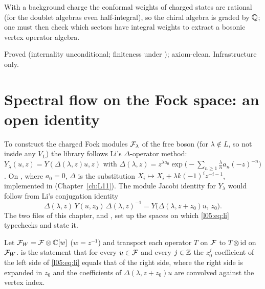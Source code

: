 \begin{physics}
With a background charge the conformal weights of charged states are rational (for the doublet algebras even
half-integral), so the chiral algebra is graded by ${\mathbb{Q}}$; one must then check which sectors have integral weights to
extract a bosonic vertex operator algebra.
\end{physics}

\begin{status}
Proved (internality unconditional; finiteness under ); axiom-clean. Infrastructure only.
\end{status}

\section{Spectral flow on the Fock space: an open identity}\label{l05:sec:li}

To construct the charged Fock modules $\mathcal{F}_\lambda$ of the free boson (for $\lambda\notin L$, so not inside any $V_L$) the
library follows Li's $\Delta$-operator method: $Y_\lambda(u,z)=Y(\Delta(\lambda,z)u,z)$ with
$\Delta(\lambda,z)=z^{\lambda a_0}\exp\big(-\sum_{n\ge1}\frac{\lambda}{n}a_n(-z)^{-n}\big)$. On , where $a_0=0$, $\Delta$ is the
substitution $X_i\mapsto X_i+\lambda k(-1)^iz^{-i-1}$, implemented in 
(Chapter~\ref{ch:L11}). The module Jacobi identity for $Y_\lambda$ would follow from Li's conjugation identity
\begin{equation}\label{l05:eq:li}
 \Delta(\lambda,z)\,Y(u,z_0)\,\Delta(\lambda,z)^{-1}=Y\big(\Delta(\lambda,z+z_0)u,\,z_0\big).
\end{equation}
The two files of this chapter,  and , set up the spaces on which
\eqref{l05:eq:li} typechecks and state it.

\begin{definition}\label{l05:def:li}
Let $\mathcal{F}_W=\mathcal{F}\otimes{\mathbb{C}}[w]$ ($w=z^{-1}$) and transport each operator $T$ on $\mathcal{F}$ to $T\otimes\mathrm{id}$ on
$\mathcal{F}_W$.  is the statement that for every $u\in\mathcal{F}$ and every $j\in{\mathbb{Z}}$ the $z_0^j$-coefficient of
the left side of \eqref{l05:eq:li} equals that of the right side, where the right side is expanded in $z_0$ and the
coefficients of $\Delta(\lambda,z+z_0)u$ are convolved against the vertex index.
\end{definition}

